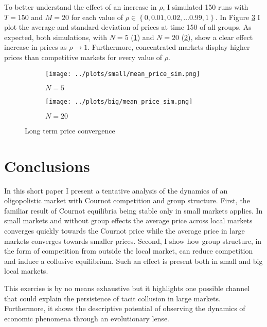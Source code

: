\documentclass[american]{scrartcl}
\newcommand{\set}[1]{\left\{#1\right\}}
\begin{document}
To better understand the effect of an increase in $\rho$, I simulated 150 runs with $T = 150$ and $M = 20$ for each value of $\rho \in \set{0, 0.01, 0.02, \ldots 0.99, 1}$. In Figure \ref{fig:sim} I plot the average and standard deviation of prices at time 150 of all groups. As expected, both simulations, with $N = 5$ (\ref{fig:sim:small}) and $N = 20$ (\ref{fig:sim:big}), show a clear effect increase in prices as $\rho \xrightarrow{} 1$. Furthermore, concentrated markets display higher prices than competitive markets for every value of $\rho$.

\begin{figure}[H]
    \begin{subfigure}{.5\textwidth}
        \centering
        \texttt{[image: ../plots/small/mean\_price\_sim.png]}
        \caption{$N = 5$}
        \label{fig:sim:small}
    \end{subfigure}%
    \begin{subfigure}{.5\textwidth}
        \centering
        \texttt{[image: ../plots/big/mean\_price\_sim.png]}
        \caption{$N = 20$}
        \label{fig:sim:big}
    \end{subfigure}
    \caption{Long term price convergence}
    \label{fig:sim}
\end{figure}

\section{Conclusions}

In this short paper I present a tentative analysis of the dynamics of an oligopolistic market with Cournot competition and group structure. First, the familiar result of Cournot equilibria being stable only in small markets applies. In small markets and without group effects the average price across local markets converges quickly towards the Cournot price while the average price in large markets converges towards smaller prices. Second, I show how group structure, in the form of competition from outside the local market, can reduce competition and induce a collusive equilibrium. Such an effect is present both in small and big local markets.

This exercise is by no means exhaustive but it highlights one possible channel that could explain the persistence of tacit collusion in large markets. Furthermore, it shows the descriptive potential of observing the dynamics of economic phenomena through an evolutionary lense.
\end{document}
